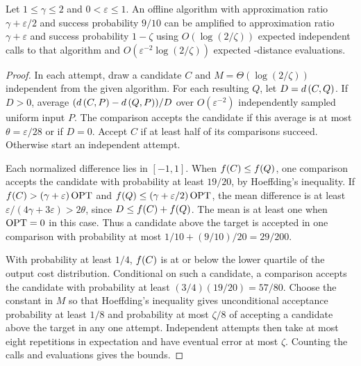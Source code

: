 \begin{lemma}\label{lem:offline-confidence}
Let $1\le\gamma\le2$ and $0<\varepsilon\le1$. An offline algorithm
with approximation ratio $\gamma+\varepsilon/2$ and success probability
$9/10$ can be amplified to approximation ratio $\gamma+\varepsilon$
and success probability $1-\zeta$ using
$O(\log(2/\zeta))$ expected independent calls to that algorithm and
$O(\varepsilon^{-2}\log(2/\zeta))$ expected \clustering-distance
evaluations.
\end{lemma}
\begin{proof}
In each attempt, draw a candidate $C$ and $M=\Theta(\log(2/\zeta))$
independent \clusterings from the given algorithm. For each resulting \clustering $Q$, let
$D=d\left(C,Q\right)$. If $D>0$, average
$(d\left(C,P\right)-d\left(Q,P\right))/D$ over $O(\varepsilon^{-2})$ independently sampled
uniform input \clusterings $P$. The comparison accepts the candidate
if this average is at most $\theta=\varepsilon/28$ or if $D=0$.
Accept $C$ if at least half of its comparisons succeed. Otherwise
start an independent attempt.

Each normalized difference lies in $[-1,1]$. When $f(C)\le f(Q)$,
one comparison accepts the candidate with probability at least $19/20$, by
Hoeffding's inequality. If $f(C)>(\gamma+\varepsilon)\operatorname{OPT}$ and
$f(Q)\le(\gamma+\varepsilon/2)\operatorname{OPT}$, the mean difference is at least
$\varepsilon/(4\gamma+3\varepsilon)>2\theta$, since
$D\le f(C)+f(Q)$. The mean is at least one when $\operatorname{OPT}=0$ in this
case. Thus a candidate above the target is accepted in one comparison
with probability at most $1/10+(9/10)/20=29/200$.

With probability at least $1/4$, $f(C)$ is at or below the lower
quartile of the output cost distribution. Conditional on such a
candidate, a comparison accepts the candidate with probability at least
$(3/4)(19/20)=57/80$. Choose the constant in $M$ so that
Hoeffding's inequality gives unconditional acceptance probability
at least $1/8$ and probability at most $\zeta/8$ of accepting a
candidate above the target in any one attempt. Independent attempts
then take at most eight repetitions in expectation and have eventual
error at most $\zeta$. Counting the calls and evaluations gives the
bounds.
\end{proof}
